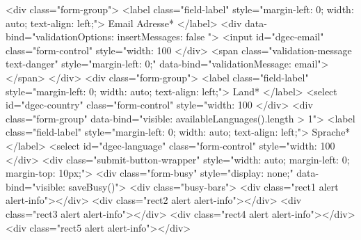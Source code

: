 {{                            <div class="form-group">
                                <label class="field-label" style="margin-left: 0; width: auto; text-align: left;">
                                    Email Adresse*
                                </label>
                                <div data-bind="validationOptions: { insertMessages: false }">
                                    <input id="dgec-email" class="form-control" style="width: 100%
                                </div>
                                <span class="validation-message text-danger" style="margin-left: 0;" data-bind="validationMessage: email"></span>
                            </div>
                            <div class="form-group">
                                <label class="field-label" style="margin-left: 0; width: auto; text-align: left;">
                                    Land*
                                </label>
                                <select id="dgec-country" class="form-control" style="width: 100%
                            </div>
                            <div class="form-group" data-bind="visible: availableLanguages().length > 1">
                                <label class="field-label" style="margin-left: 0; width: auto; text-align: left;">
                                    Sprache*
                                </label>
                                <select id="dgec-language" class="form-control" style="width: 100%
                            </div>
                            <div class="submit-button-wrapper" style="width: auto; margin-left: 0; margin-top: 10px;">
                                <div class="form-busy" style="display: none;" data-bind="visible: saveBusy()">
                                    <div class="busy-bars">
                                        <div class="rect1 alert alert-info"></div>
                                        <div class="rect2 alert alert-info"></div>
                                        <div class="rect3 alert alert-info"></div>
                                        <div class="rect4 alert alert-info"></div>
                                        <div class="rect5 alert alert-info"></div>
}}
